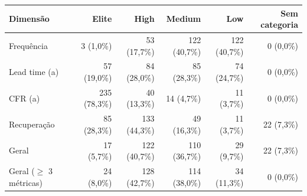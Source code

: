 \begin{tabular}{lrrrrr}
\hline
Dimensão & Elite & High & Medium & Low & Sem categoria \\
\hline
Frequência & 3 (1,0\%) & 53 (17,7\%) & 122 (40,7\%) & 122 (40,7\%) & 0 (0,0\%) \\
Lead time (a) & 57 (19,0\%) & 84 (28,0\%) & 85 (28,3\%) & 74 (24,7\%) & 0 (0,0\%) \\
CFR (a) & 235 (78,3\%) & 40 (13,3\%) & 14 (4,7\%) & 11 (3,7\%) & 0 (0,0\%) \\
Recuperação & 85 (28,3\%) & 133 (44,3\%) & 49 (16,3\%) & 11 (3,7\%) & 22 (7,3\%) \\
Geral & 17 (5,7\%) & 122 (40,7\%) & 110 (36,7\%) & 29 (9,7\%) & 22 (7,3\%) \\
\hline
Geral ($\geq$ 3 métricas) & 24 (8,0\%) & 128 (42,7\%) & 114 (38,0\%) & 34 (11,3\%) & 0 (0,0\%) \\
\hline
\end{tabular}
